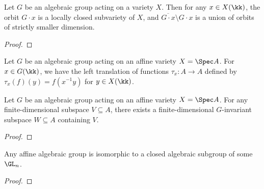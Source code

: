
    \begin{proposition}\label{prop:orbit_is_locally_closed}
        Let \(G\) be an algebraic group acting on a variety \(X\).
        Then for any \(x \in X(\kk)\), the orbit \(G \cdot x\) is a locally closed subvariety of \(X\), and \(\overline{G \cdot x} \setminus G \cdot x \) is a union of orbits of strictly smaller dimension.
    \end{proposition}
    \begin{proof}
    \end{proof}


    Let \(G\) be an algebraic group acting on an affine variety \(X = \Spec A\).
    For \(x \in G(\kk)\), we have the left translation of functions \(\tau_x: A \to A\) defined by \(\tau_x(f)(y) = f(x^{-1}y)\) for \(y \in X(\kk)\).

    \begin{lemma}\label{lem:finite_dimensional_invariant_subspace}
        Let \(G\) be an algebraic group acting on an affine variety \(X = \Spec A\).
        For any finite-dimensional subspace \(V \subseteq A\), there exists a finite-dimensional \(G\)-invariant subspace \(W \subseteq A\) containing \(V\).
    \end{lemma}
    \begin{proof}
    \end{proof}

    \begin{theorem}\label{thm:affine_algebraic_group_is_linear}
        Any affine algebraic group is isomorphic to a closed algebraic subgroup of some \(\GL_n\).
    \end{theorem}
    \begin{proof}
    \end{proof}

